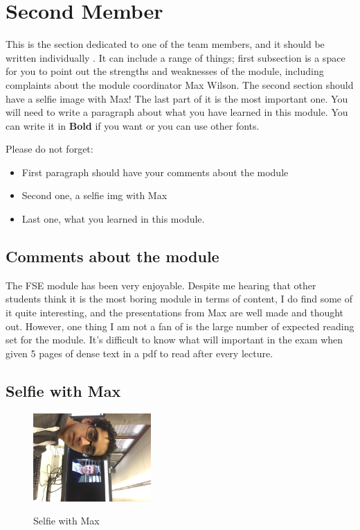 \section{Second Member}
This is the section dedicated to one of the team members, and it should be written individually . It can include a range of things; first subsection is a space for you to point out the strengths and weaknesses of the module, including complaints about the module coordinator Max Wilson. The second section should have a selfie image with Max! The last part of it is the most important one. You will need to write a paragraph about what you have learned in this module. You can write it in \textbf{Bold} if you want or you can use other fonts. 

Please do not forget:
\begin{itemize}
	\item First paragraph should have your comments about the module
	\item Second one, a selfie img with Max
	\item Last one, what you learned in this module.
\end{itemize}

\subsection{Comments about the module}
The FSE module has been very enjoyable. Despite me hearing that other students think it is the most boring module in terms of content, I do find some of it quite interesting, and the presentations from Max are well made and thought out. However, one thing I am not a fan of is the large number of expected reading set for the module. It's difficult to know what will important in the exam when given 5 pages of dense text in a pdf to read after every lecture.

\subsection{Selfie with Max}
\begin{figure}[h]
\caption{Selfie with Max}
\centering
\includegraphics[width=0.4\textwidth]{psyit_real_selfie}
\label{fig:selfie}
\end{figure}

